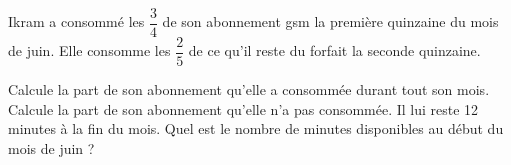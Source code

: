 %
%
    Ikram a consommé les $\dfrac{3}{4}$ de son abonnement gsm
    la première quinzaine du mois de juin.
    Elle consomme les $\dfrac{2}{5}$ de ce qu'il reste du forfait
    la seconde quinzaine.
    \begin{tasks}
        \task Calcule la part de son abonnement qu'elle a consommée durant tout
        son mois.
        \task Calcule la part de son abonnement qu'elle n'a pas consommée.
        \task Il lui reste 12 minutes à la fin du mois. Quel est le nombre de
        minutes disponibles au début du mois de juin ?
    \end{tasks}
